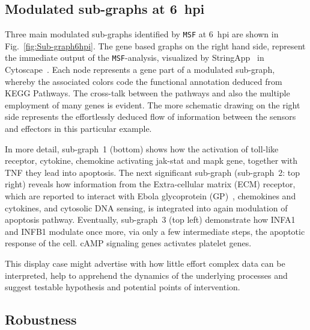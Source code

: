 \documentclass[10pt,a4paper,twocolumn]{article}
\begin{document}
	\subsection*{Modulated sub-graphs at 6~hpi}
	
	Three main modulated sub-graphs identified by \texttt{MSF} at 6~hpi are
	shown in Fig.~\ref{fig:Sub-graph6hpi}. The gene based graphs on the right
	hand side, represent the immediate output of the \texttt{MSF}-analysis,
	visualized by StringApp~\cite{StringApp} in Cytoscape~\cite{Cyto}. Each
	node represents a gene part of a modulated sub-graph, whereby the
	associated colors code the functional annotation deduced from KEGG
	Pathways. The cross-talk between the pathways and also the multiple
	employment of many genes is evident. The more schematic drawing on the
	right side represents the effortlessly deduced flow of information between
	the sensors and effectors in this particular example.
	
	In more detail, sub-graph~1 (bottom) shows how the activation of toll-like
	receptor, cytokine, chemokine activating jak-stat and mapk gene, together with TNF they lead into apoptosis. The next significant sub-graph (sub-graph~2: top right) reveals
	how information from the Extra-cellular matrix (ECM) receptor, which are
	reported to interact with Ebola glycoprotein (GP)~\cite{Veljkovic},
	chemokines and cytokines, and cytosolic DNA sensing, is integrated into
	again modulation of apoptosis pathway. Eventually, sub-graph~3 (top left)
	demonstrate how INFA1 and INFB1 modulate once more, via only a few
	intermediate steps, the apoptotic response of the cell. cAMP signaling genes activates platelet genes.
	
	This display case might advertise with how little effort complex data
	can be interpreted, help to apprehend the dynamics of the underlying
	processes and suggest testable hypothesis and potential points of
	intervention.
	
	\subsection*{Robustness}
	
\end{document}
